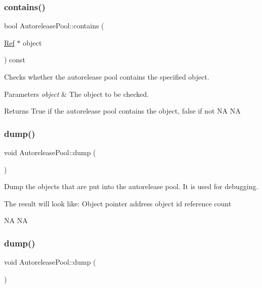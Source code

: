 \subsubsection{\texorpdfstring{contains()}{contains()}\hspace{0.1cm}{\footnotesize\ttfamily [2/2]}}
{\footnotesize\ttfamily bool Autorelease\+Pool\+::contains (\begin{DoxyParamCaption}\item[{\hyperlink{classRef}{Ref} $\ast$}]{object }\end{DoxyParamCaption}) const}

Checks whether the autorelease pool contains the specified object.


\begin{DoxyParams}{Parameters}
{\em object} & The object to be checked. \\
\hline
\end{DoxyParams}
\begin{DoxyReturn}{Returns}
True if the autorelease pool contains the object, false if not  NA  NA 
\end{DoxyReturn}
\mbox{\label{classAutoreleasePool_abae69c2b9da80a71bcb095cb557a03d0}} 
\subsubsection{\texorpdfstring{dump()}{dump()}\hspace{0.1cm}{\footnotesize\ttfamily [1/2]}}
{\footnotesize\ttfamily void Autorelease\+Pool\+::dump (\begin{DoxyParamCaption}{ }\end{DoxyParamCaption})}

Dump the objects that are put into the autorelease pool. It is used for debugging.

The result will look like\+: Object pointer address object id reference count

NA  NA \mbox{\label{classAutoreleasePool_abae69c2b9da80a71bcb095cb557a03d0}} 
\subsubsection{\texorpdfstring{dump()}{dump()}\hspace{0.1cm}{\footnotesize\ttfamily [2/2]}}
{\footnotesize\ttfamily void Autorelease\+Pool\+::dump (\begin{DoxyParamCaption}{ }\end{DoxyParamCaption})}

